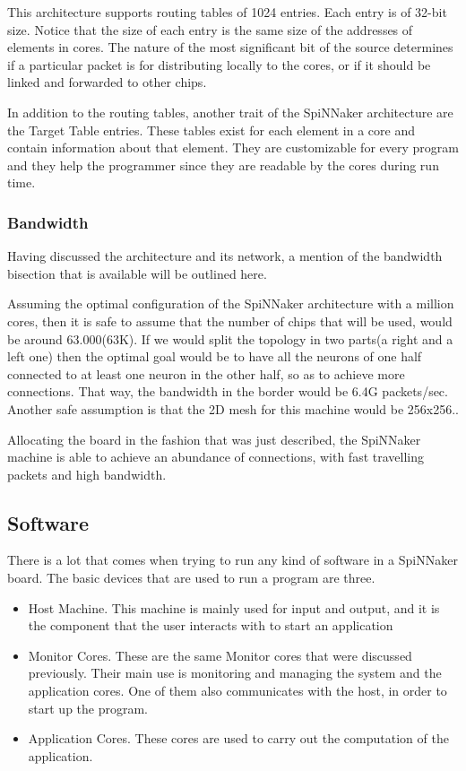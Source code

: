 \documentclass[12pt,a4paper]{article}
\begin{document}
This architecture supports routing tables of 1024 entries. Each entry is of 32-bit size. Notice that the size of each entry is the same size of the addresses of elements in cores. The nature of the most significant bit of the source determines if a particular packet is for distributing locally to the cores, or if it should be linked and forwarded to other chips\cite{docfile}.

In addition to the routing tables, another trait of the SpiNNaker architecture are the Target Table entries. These tables exist for each element in a core and contain information about that element. They are customizable for every program and they help the programmer since they are readable by the cores during run time. 
\subsubsection{Bandwidth}
Having discussed the architecture and its network, a mention of the bandwidth bisection that is available will be outlined here. 

Assuming the optimal configuration of the SpiNNaker architecture with a million cores, then it is safe to assume that the number of chips that will be used, would be around 63.000(63K). If we would split the topology in two parts(a right and a left one) then the optimal goal would be to have all the neurons of one half connected to at least one neuron in the other half, so as to achieve more connections. That way, the bandwidth in the border would be 6.4G packets/sec. Another safe assumption is that the 2D mesh for this machine would be 256x256.\cite{docfile}\cite{navaridas2009understanding}.

Allocating the board in the fashion that was just described, the SpiNNaker machine is able to achieve an abundance of connections, with fast travelling packets and high bandwidth.
\subsection{Software}
There is a lot that comes when trying to run any kind of software in a SpiNNaker board. The basic devices that are used to run a program are three.
\begin{itemize}
\item Host Machine. This machine is mainly used for input and output, and it is the component that the user interacts with to start an application
\item Monitor Cores. These are the same Monitor cores that were discussed previously. Their main use is monitoring and managing the system and the application cores. One of them also communicates with the host, in order to start up the program.
\item Application Cores. These cores are used to carry out the computation of the application.\cite{furber2012overview}
\end{itemize}
\end{document}
